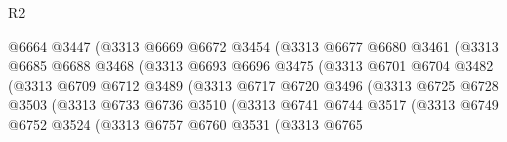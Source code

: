 \begin{lexlean}{R2}
\begin{coremodule}
                                @6664
                                @3447
                                (@3313
                                  @6669
                                  @6672
                                  @3454
                                  (@3313
                                    @6677
                                    @6680
                                    @3461
                                    (@3313
                                      @6685
                                      @6688
                                      @3468
                                      (@3313
                                        @6693
                                        @6696
                                        @3475
                                        (@3313
                                          @6701
                                          @6704
                                          @3482
                                          (@3313
                                            @6709
                                            @6712
                                            @3489
                                            (@3313
                                              @6717
                                              @6720
                                              @3496
                                              (@3313
                                                @6725
                                                @6728
                                                @3503
                                                (@3313
                                                  @6733
                                                  @6736
                                                  @3510
                                                  (@3313
                                                    @6741
                                                    @6744
                                                    @3517
                                                    (@3313
                                                      @6749
                                                      @6752
                                                      @3524
                                                      (@3313
                                                        @6757
                                                        @6760
                                                        @3531
                                                        (@3313
                                                          @6765

\end{coremodule}
\end{lexlean}
